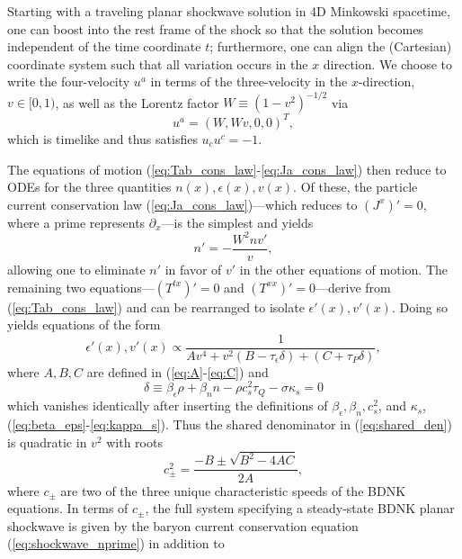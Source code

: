 \documentclass[%
notitlepage,
superscriptaddress,
nofootinbib,
amsmath,
amssymb,
aps,
twocolumn
]{revtex4-1}
\begin{document}
Starting with a traveling planar shockwave solution in 4D Minkowski spacetime, one can boost into the rest frame of the shock so that the solution becomes independent of the time coordinate $t$; furthermore, one can align the (Cartesian) coordinate system such that all variation occurs in the $x$ direction. We choose to write the four-velocity $u^{a}$ in terms of the three-velocity in the $x$-direction, $v \in [0,1)$, as well as the Lorentz factor ${W \equiv (1 - v^2)^{-1/2}}$ via
\begin{equation}
u^{a} = (W, W v, 0, 0)^{T},
\end{equation}
which is timelike and thus satisfies $u_{c} u^{c} = -1$.  

The equations of motion (\ref{eq:Tab_cons_law}-\ref{eq:Ja_cons_law}) then reduce to ODEs for the three quantities $n(x), \epsilon(x), v(x)$.  Of these, the particle current conservation law (\ref{eq:Ja_cons_law})---which reduces to $(J^{x})' = 0$, where a prime represents $\partial_{x}$---is the simplest and yields
\begin{equation} \label{eq:shockwave_nprime}
n' = - \frac{W^2 n v'}{v},
\end{equation}
allowing one to eliminate $n'$ in favor of $v'$ in the other equations of motion.  The remaining two equations---$(T^{tx})' = 0$ and $(T^{xx})' = 0$---derive from (\ref{eq:Tab_cons_law}) and can be rearranged to isolate $\epsilon'(x), v'(x)$.  Doing so yields equations of the form
\begin{equation} \label{eq:shared_den}
\epsilon'(x), v'(x) \propto \frac{1}{A v^4 + v^2 ( B - \tau_{\epsilon} \delta )
+ ( C + \tau_{P} \delta )},
\end{equation}
where $A, B, C$ are defined in (\ref{eq:A}-\ref{eq:C}) and
\begin{equation}
\delta \equiv \beta_{\epsilon} \rho + \beta_{n} n - \rho c_s^2 \tau_{Q} - \sigma \kappa_s = 0
\end{equation}
which vanishes identically after inserting the definitions of
$\beta_{\epsilon}, \beta_{n}, c_s^2$, and $\kappa_{s}$,
(\ref{eq:beta_eps}-\ref{eq:kappa_s}).  Thus the shared denominator in
(\ref{eq:shared_den}) is quadratic in $v^2$ with roots
\begin{equation} \label{cpmsq_general}
c_{\pm}^2 = \frac{-B \pm \sqrt{B^2 - 4 A C}}{2 A},
\end{equation}
where $c_{\pm}$ are two of the three unique characteristic speeds of the BDNK equations.  In terms of $c_{\pm}$, the full system specifying a steady-state BDNK planar shockwave is given by the baryon current conservation equation (\ref{eq:shockwave_nprime}) in addition to
\end{document}
